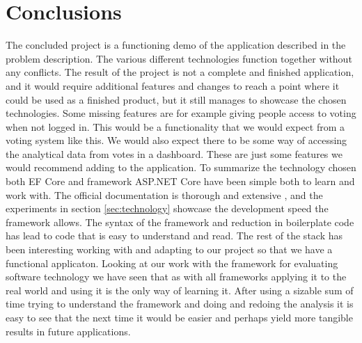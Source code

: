 \section{Conclusions}
\label{sec:conclusions}

The concluded project is a functioning demo of the application described in the problem description. 
The various different technologies function together without any conflicts. 
The result of the project is not a complete and finished application, and it would require additional features and changes to reach a point where it could be used as a finished product, but it still manages to showcase the chosen technologies.
Some missing features are for example giving people access to voting when not logged in. This would be a functionality that we would expect from a voting system like this. We would also expect there to be some way of accessing the analytical data from votes in a dashboard. These are just some features we would recommend adding to the application.
To summarize the technology chosen both EF Core and framework ASP.NET Core have been simple both to learn and work with. 
The official documentation is thorough and extensive \cite{EFoverview}, and the experiments in section \ref{sec:technology} showcase the development speed the framework allows. 
The syntax of the framework and reduction in boilerplate code has lead to code that is easy to understand and read.
The rest of the stack has been interesting working with and adapting to our project so that we have a functional applicaton.
Looking at our work with the framework for evaluating software technology we have seen that as with all frameworks applying it to the real world and using it is the only way of learning it.
After using a sizable sum of time trying to understand the framework and doing and redoing the analysis it is easy to see that the next time it would be easier and perhaps yield more tangible results in future applications.

